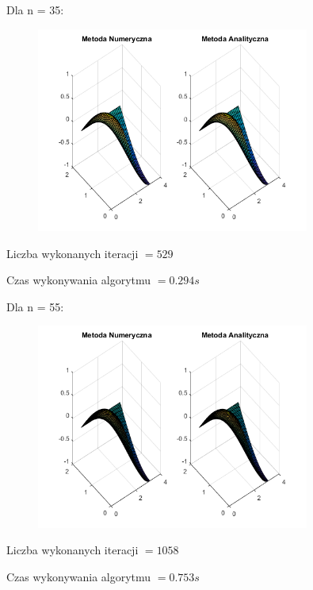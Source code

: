 Dla n = 35:

\begin{figure}[!ht]
	\begin{center}
		\includegraphics[width=0.8\textwidth]{Lab6/charts/jacobi/zad2/35.png}
	\end{center}
\end{figure}

Liczba wykonanych iteracji $ = 529 $

Czas wykonywania algorytmu $ = 0.294 s$



Dla n = 55:

\begin{figure}[!ht]
	\begin{center}
		\includegraphics[width=0.8\textwidth]{Lab6/charts/jacobi/zad2/55.png}
	\end{center}
\end{figure}

Liczba wykonanych iteracji $ = 1058 $

Czas wykonywania algorytmu $ = 0.753 s$

